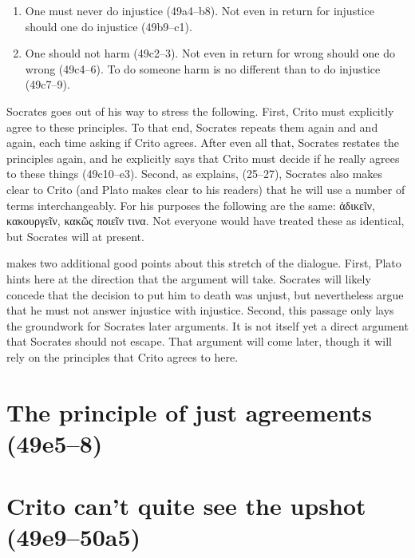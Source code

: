 \documentclass[11pt]{article}
\begin{document}
\begin{enumerate}
    \item One must never do injustice (49a4--b8).  Not even in return for injustice should one do injustice (49b9--c1).
    \item One should not harm (49c2--3).  Not even in return for wrong should one do wrong (49c4--6).  To do someone harm is no different than to do injustice (49c7--9).
\end{enumerate}

Socrates goes out of his way to stress the following.  First, Crito must explicitly agree to these principles.  To that end, Socrates repeats them again and and again, each time asking if Crito agrees.  After even all that, Socrates restates the principles again, and he explicitly says that Crito must decide if he really agrees to these things (49c10--e3).  Second, as \citet{kraut1984} explains, (25--27), Socrates also makes clear to Crito (and Plato makes clear to his readers) that he will use a number of terms interchangeably.  For his purposes the following are the same: ἀδικεῖν, κακουργεῖν, κακῶς ποιεῖν τινα.  Not everyone would have treated these as identical, but Socrates will at present.

\citet{kraut1984} makes two additional good points about this stretch of the dialogue.  First, Plato hints here at the direction that the argument will take. Socrates will likely concede that the decision to put him to death was unjust, but nevertheless argue that he must not answer injustice with injustice.  Second, this passage only lays the groundwork for Socrates later arguments.  It is not itself yet a direct argument that Socrates should not escape.  That argument will come later, though it will rely on the principles that Crito agrees to here.

\section{The principle of just agreements (49e5--8)}



\section{Crito can't quite see the upshot (49e9--50a5)}
\end{document}
